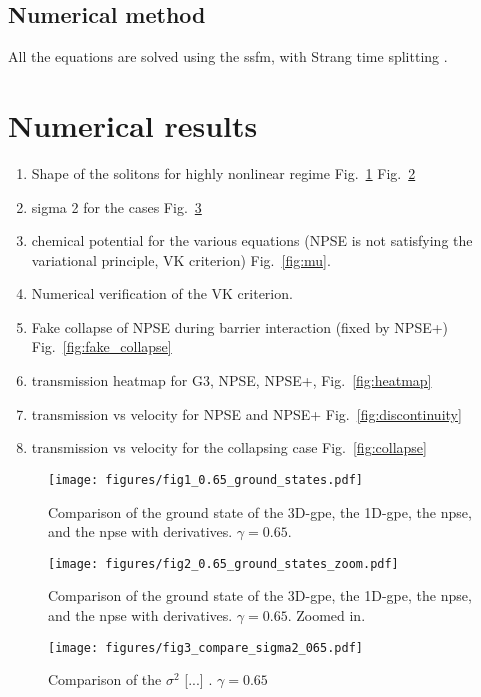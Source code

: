 \documentclass[pra,twocolumn]{revtex4-2}
\begin{document}
  \subsection{Numerical method}
  All the equations are solved using the \gls{ssfm}, with Strang time splitting \cite{a}.

\section{Numerical results}\label{sec:num}
\begin{enumerate}\label{itemize_result}
  \item Shape of the solitons for highly nonlinear regime Fig.~\ref{fig:GS} Fig.~\ref{fig:GS_zoom}
  \item sigma 2 for the cases Fig.~\ref{fig:sigma2}
  \item chemical potential for the various equations (NPSE is not satisfying the variational principle, VK criterion) Fig.~\ref{fig:mu}.
  \item Numerical verification of the VK criterion.
  \item Fake collapse of NPSE during barrier interaction (fixed by NPSE+) Fig.~\ref{fig:fake_collapse}
  \item transmission heatmap for G3, NPSE, NPSE+, Fig.~\ref{fig:heatmap}
  \item transmission vs velocity for NPSE and NPSE+ Fig.~\ref{fig:discontinuity}
  \item transmission vs velocity for the collapsing case Fig.~\ref{fig:collapse}
\end{enumerate}

\begin{figure}
  \texttt{[image: figures/fig1\_0.65\_ground\_states.pdf]}
  \caption{Comparison of the ground state of the 3D-\gls{gpe}, the 1D-\gls{gpe}, the \gls{npse}, and the \gls{npse} with derivatives. $\gamma=0.65$.}
  \label{fig:GS}
\end{figure}

\begin{figure}
  \texttt{[image: figures/fig2\_0.65\_ground\_states\_zoom.pdf]}
  \caption{Comparison of the ground state of the 3D-\gls{gpe}, the 1D-\gls{gpe}, the \gls{npse}, and the \gls{npse} with derivatives. $\gamma=0.65$. Zoomed in.}
  \label{fig:GS_zoom}
\end{figure}

\begin{figure}
  \texttt{[image: figures/fig3\_compare\_sigma2\_065.pdf]}
  \caption{Comparison of the $\sigma^2$ [...] . $\gamma=0.65$}
  \label{fig:sigma2}
\end{figure}
\end{document}
